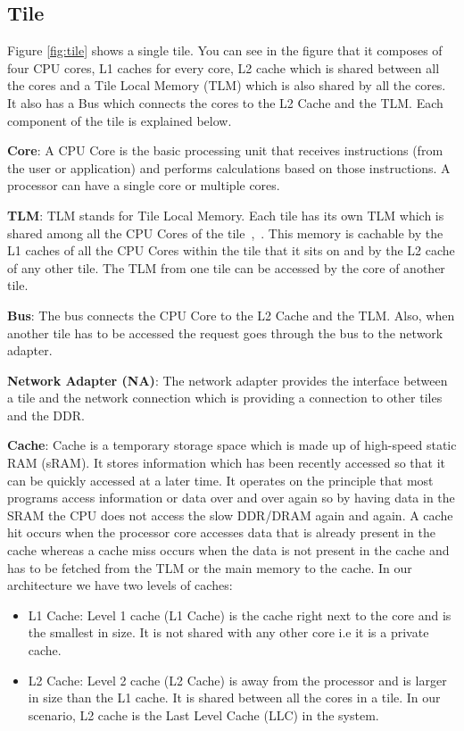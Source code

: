 \documentclass{listhesis}
\begin{document}
\subsection{Tile}
Figure \ref{fig:tile} shows a single tile. You can see in the figure that it composes of four CPU cores, L1 caches for every core, L2 cache which is shared between all the cores and a Tile Local Memory (TLM) which is also shared by all the cores. It also has a Bus which connects the cores to the L2 Cache and the TLM. Each component of the tile is explained below.\\
\par
\textbf{Core}: A CPU Core is the basic processing unit that receives instructions (from the user or application) and performs calculations based on those instructions. A processor can have a single core or multiple cores. \\ 
\par
\textbf{TLM}: TLM stands for Tile Local Memory. Each tile has its own TLM which is shared among all the CPU Cores of the tile~\cite{ankitThesis},~\cite{iNetworkAdapter}. This memory is cachable by the L1 caches of all the CPU Cores within the tile that it sits on and by the L2 cache of any other tile. The TLM from one tile can be accessed by the core of another tile.\\
\par
\textbf{Bus}: The bus connects the CPU Core to the L2 Cache and the TLM. Also, when another tile has to be accessed the request goes through the bus to the network adapter.\\
\par
\textbf{Network Adapter (NA)}: The network adapter provides the interface between a tile and the network connection which is providing a connection to other tiles and the DDR.\\
\par
\textbf{Cache}: Cache is a temporary storage space which is made up of high-speed static RAM (sRAM). It stores information which has been recently accessed so that it can be quickly accessed at a later time. It operates on the principle that most programs access information or data over and over again so by having data in the SRAM the CPU does not access the slow DDR/DRAM again and again. A cache hit occurs when the processor core accesses data that is already present in the cache whereas a cache miss occurs when the data is not present in the cache and has to be fetched from the TLM or the main memory to the cache. In our architecture we have two levels of caches:
\begin{itemize}
  \item L1 Cache: Level 1 cache (L1 Cache) is the cache right next to the core and is the smallest in size. It is not shared with any other core i.e it is a private cache.
  \item L2 Cache: Level 2 cache (L2 Cache) is away from the processor and is larger in size than the L1 cache. It is shared between all the cores in a tile. In our scenario, L2 cache is the Last Level Cache (LLC) in the system.
\end{itemize}
\end{document}
